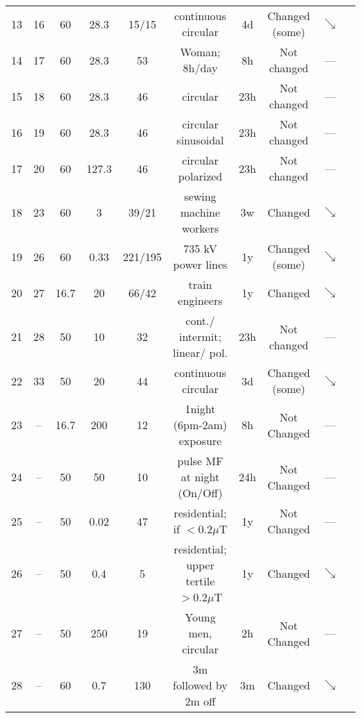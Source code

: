 \begin{tabular}{cccccccccc}
13& 16 & 60 & 28.3 & 15/15 & continuous circular & 4d & Changed (some) & $\searrow$& \citet{Graham2000} \\
14& 17 & 60 & 28.3 & 53 & Woman; 8h/day & 8h & Not changed & --- &\citet{Graham2001a} \\
15& 18 & 60 & 28.3 & 46 & circular & 23h & Not changed & --- &\citet{Graham2001b} \\
16& 19 & 60 & 28.3 & 46 &circular sinusoidal & 23h & Not changed & --- &\citet{Graham2001b} \\ 
17& 20 & 60 & 127.3 & 46 &circular polarized & 23h & Not changed & --- &\citet{Graham2001b} \\
18& 23 & 60 & 3 & 39/21 & sewing machine workers  & 3w & Changed & $\searrow$&  \citet{Juutilainen2000} \\
19 & 26 & 60 & 0.33 & 221/195 & 735 kV power lines & 1y & Changed  (some) & $\searrow$& \citet{Levallois2001} \\
20 & 27 & 16.7 &20 & 66/42 & train engineers  & 1y & Changed & $\searrow$& \citet{Pfluger1996} \\
21 & 28 & 50 & 10 & 32 & cont./ intermit; linear/ pol. & 23h & Not changed & --- & \citet{Selmaoui1996} \\
22 & 33 & 50 & 20 & 44 & continuous circular  & 3d & Changed (some) & $\searrow$& \citet{Wood1998}\\ %
23& -- & 16.7 & 200 & 12 & 1night (6pm-2am) exposure         & 8h & Not Changed & ---& \citet{Griefahn2001} \\
24& -- &50& 50 & 10 & pulse MF at night  (On/Off)             &24h & Not Changed & ---& \citet{Kurokawa2003}\\
25& -- &50& 0.02 & 47 & residential;    if $<0.2\mu$T                     &  1y & Not Changed & ---& \citet{Cocco2005}\\
26& -- &50& 0.4 & 5 & residential;   upper tertile $>0.2\mu$T  &  1y & Changed   & $\searrow$& \citet{Cocco2005}\\
27 & -- & 50 & 250  & 19 & Young men,  circular               & 2h &Not  Changed & --- & \citet{Warman2003}\\
28 & -- & 60 & 0.7 & 130 & 3m followed by 2m off      & 3m & Changed & $\searrow$& \citet{Davis2006}\\
\hline
\end{tabular}
